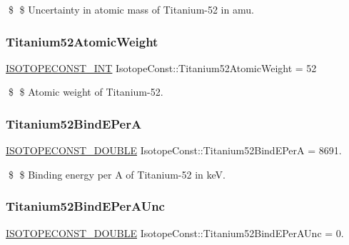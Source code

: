 \$ \$ Uncertainty in atomic mass of Titanium-\/52 in amu. \mbox{\label{group___isotope_const-_titanium-_ti52_gabd680c1f155d603f811d54a40d03e7f5}} 
\subsubsection{\texorpdfstring{Titanium52\+Atomic\+Weight}{Titanium52AtomicWeight}}
{\footnotesize\ttfamily \mbox{\hyperlink{group___isotope_const-_macros_ga5f18360b3e99483a35c32d789e62621c}{I\+S\+O\+T\+O\+P\+E\+C\+O\+N\+S\+T\+\_\+\+I\+NT}} Isotope\+Const\+::\+Titanium52\+Atomic\+Weight = 52}

\$ \$ Atomic weight of Titanium-\/52. \mbox{\label{group___isotope_const-_titanium-_ti52_gacfd12424f065db7c476c31b0ab5de896}} 
\subsubsection{\texorpdfstring{Titanium52\+Bind\+E\+PerA}{Titanium52BindEPerA}}
{\footnotesize\ttfamily \mbox{\hyperlink{group___isotope_const-_macros_ga8f45a7272ce02c0b4c65c44636ed719a}{I\+S\+O\+T\+O\+P\+E\+C\+O\+N\+S\+T\+\_\+\+D\+O\+U\+B\+LE}} Isotope\+Const\+::\+Titanium52\+Bind\+E\+PerA = 8691.}

\$ \$ Binding energy per A of Titanium-\/52 in keV. \mbox{\label{group___isotope_const-_titanium-_ti52_gadc872638e12eb2eca12e233dd2eb9012}} 
\subsubsection{\texorpdfstring{Titanium52\+Bind\+E\+Per\+A\+Unc}{Titanium52BindEPerAUnc}}
{\footnotesize\ttfamily \mbox{\hyperlink{group___isotope_const-_macros_ga8f45a7272ce02c0b4c65c44636ed719a}{I\+S\+O\+T\+O\+P\+E\+C\+O\+N\+S\+T\+\_\+\+D\+O\+U\+B\+LE}} Isotope\+Const\+::\+Titanium52\+Bind\+E\+Per\+A\+Unc = 0.}

